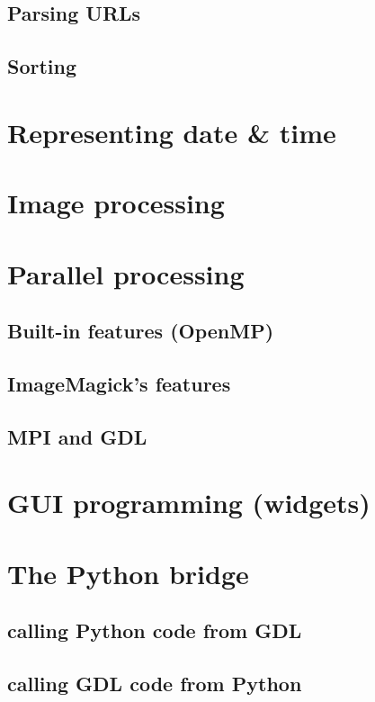 \documentclass[10pt,titleauthor,openany]{mwbk}
\begin{document}
  \section{Parsing URLs}
  \section{Sorting}

  \chapter{Representing date \& time}

  \chapter{Image processing}
  
  \chapter{Parallel processing}
  \section{Built-in features (OpenMP)}
  
  \section{ImageMagick's features}
  \section{MPI and GDL}

  \chapter{GUI programming (widgets)}
  
 
  \chapter{The Python bridge}
  \section{calling Python code from GDL}
  \section{calling GDL code from Python}
  
\end{document}
